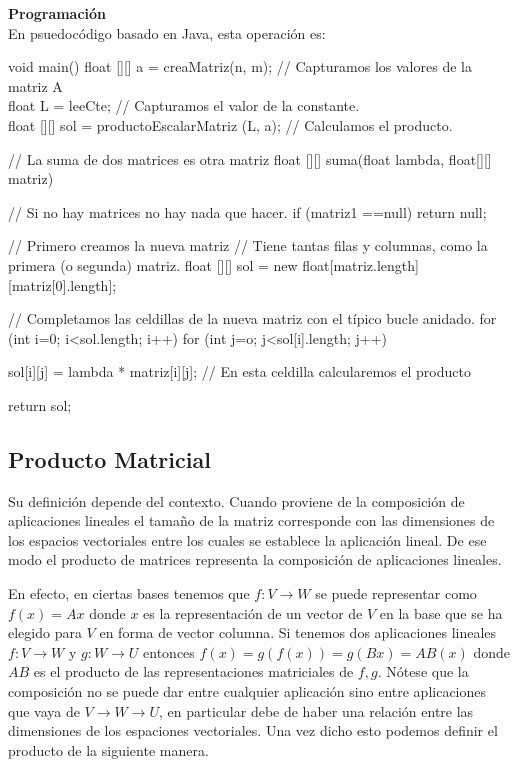 \documentclass[10pt]{article}
\begin{document}
\noindent\textbf{Programación} \\

En psuedocódigo basado en Java, esta operación es:

\begin{code}[caption=Suma de Matrices, label=default]
void main() {
  float [][] a = creaMatriz(n, m); // Capturamos los valores de la matriz A \\
  float L = leeCte; // Capturamos el valor de la constante. \\
  float [][] sol = productoEscalarMatriz (L, a); // Calculamos el producto. \\
} 

// La suma de dos matrices es otra matriz
float [][] suma(float lambda, float[][] matriz) {
   // Si no hay matrices no hay nada que hacer.
   if (matriz1 ==null) return null;
   
   // Primero creamos la nueva matriz
   // Tiene tantas filas y columnas, como la primera (o segunda) matriz.
   float [][] sol = new float[matriz.length][matriz[0].length];
   
   // Completamos las celdillas de la nueva matriz con el típico bucle anidado.
   for (int i=0; i<sol.length; i++)
     for (int j=o; j<sol[i].length; j++)
     
       sol[i][j] = lambda * matriz[i][j]; // En esta celdilla calcularemos el producto
       
   return sol;
}    
\end{code}
\subsection{Producto Matricial}

Su definición depende del contexto. Cuando proviene de la composición de aplicaciones lineales el tamaño de la matriz corresponde con las dimensiones de los espacios vectoriales entre los cuales se establece la aplicación lineal. De ese modo el producto de matrices representa la composición de aplicaciones lineales.

En efecto, en ciertas bases tenemos que $f : V \longrightarrow W$ se puede representar como $f(x) = Ax$ donde $x$ es la representación de un vector de $V$ en la base que se ha elegido para $V$ en forma de vector columna. Si tenemos dos aplicaciones lineales $f : V \longrightarrow W$ y $g : W \longrightarrow U$ entonces $f(x) = g(f(x)) = g(Bx) = AB(x)$ donde $AB$ es el producto de las representaciones matriciales de $f, g$. Nótese que la composición no se puede dar entre cualquier aplicación sino entre aplicaciones que vaya de $V \rightarrow W \rightarrow U$, en particular debe de haber una relación entre las dimensiones de los espaciones vectoriales. Una vez dicho esto podemos definir el producto de la siguiente manera. \\
\end{document}
